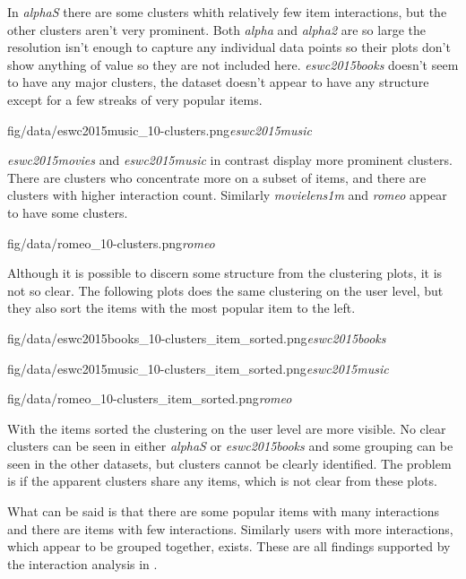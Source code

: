 \FloatBarrier

In \textit{alphaS} there are some clusters whith relatively few item interactions, but the other clusters aren't very prominent. Both \textit{alpha} and \textit{alpha2} are so large the resolution isn't enough to capture any individual data points so their plots don't show anything of value so they are not included here.
\textit{eswc2015books} doesn't seem to have any major clusters, the dataset doesn't appear to have any structure except for a few streaks of very popular items.

{fig/data/eswc2015music_10-clusters.png}{\textit{eswc2015music}}

\textit{eswc2015movies} and \textit{eswc2015music} in contrast display more prominent clusters. There are clusters who concentrate more on a subset of items, and there are clusters with higher interaction count.  Similarly \textit{movielens1m} and \textit{romeo} appear to have some clusters.

{fig/data/romeo_10-clusters.png}{\textit{romeo}}

\FloatBarrier

Although it is possible to discern some structure from the clustering plots, it is not so clear. The following plots does the same clustering on the user level, but they also sort the items with the most popular item to the left.

\FloatBarrier

{fig/data/eswc2015books_10-clusters_item_sorted.png}{\textit{eswc2015books}}

{fig/data/eswc2015music_10-clusters_item_sorted.png}{\textit{eswc2015music}}

{fig/data/romeo_10-clusters_item_sorted.png}{\textit{romeo}}

\FloatBarrier

With the items sorted the clustering on the user level are more visible. No clear clusters can be seen in either \textit{alphaS} or \textit{eswc2015books} and some grouping can be seen in the other datasets, but clusters cannot be clearly identified. The problem is if the apparent clusters share any items, which is not clear from these plots.

What can be said is that there are some popular items with many interactions and there are items with few interactions. Similarly users with more interactions, which appear to be grouped together, exists. These are all findings supported by the interaction analysis in .

